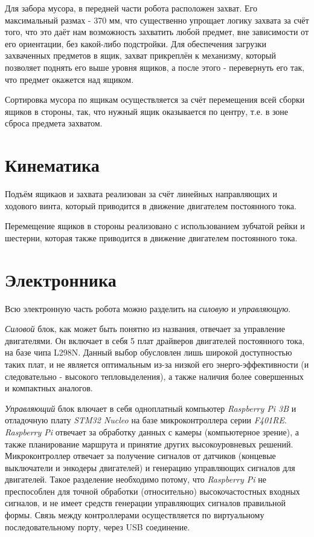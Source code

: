 \documentclass[11pt]{article}
\let\oldsection\section
\renewcommand\section{\pagebreak\oldsection}
\begin{document}
Для забора мусора, в передней части робота расположен захват. Его максимальный размах - 370 мм, что существенно упрощает логику захвата за счёт того, что это даёт нам возможность захватить любой предмет, вне зависимости от его ориентации, без какой-либо подстройки. Для обеспечения загрузки захваченных предметов в ящик, захват прикреплён к механизму, который позволяет поднять его выше уровня ящиков, а после этого - перевернуть его так, что предмет окажется над ящиком.

Сортировка мусора по ящикам осуществляется за счёт перемещения всей сборки ящиков в стороны, так, что нужный ящик оказывается по центру, т.е. в зоне сброса предмета захватом.
\section{Кинематика}
\label{sec:orgeab545d}
Подъём ящикаов и захвата реализован за счёт линейных направляющих и ходового винта, который приводится в движение двигателем постоянного тока.

Перемещение ящиков в стороны реализовано с использованием зубчатой рейки и шестерни, которая также приводится в движение двигателем постоянного тока.
\section{Электронника}
\label{sec:org85b2dec}
Всю электронную часть робота можно разделить на \emph{силовую} и \emph{управляющую}.

\emph{Силовой} блок, как может быть понятно из названия, отвечает за управление двигателями. Он включает в себя 5 плат драйверов двигателей постоянного тока, на базе чипа L298N. Данный выбор обусловлен лишь широкой доступностью таких плат, и не является оптимальным из-за низкой его энерго-эффективности (и следовательно - высокого тепловыделения), а также наличия более совершенных и компактных аналогов.

\emph{Управляющий} блок влючает в себя одноплатный компьютер \emph{Raspberry Pi 3B} и отладочную плату \emph{STM32 Nucleo} на базе микроконтроллера серии \emph{F401RE}.
\emph{Raspberry Pi} отвечает за обработку данных с камеры (компьютерное зрение), а также планирование маршрута и принятие других высокоуровневых решений.
Микроконтроллер отвечает за получение сигналов от датчиков (концевые выключатели и энкодеры двигателей) и генерацию управляющих сигналов для двигателей.
Такое разделение необходимо потому, что \emph{Raspberry Pi} не преспособлен для точной обработки (относительно) высокочастостных входных сигналов, и не имеет средств генерации управляющих сигналов правильной формы.
Связь между контроллерами осуществляется по виртуальному последовательному порту, через USB соединение.
\end{document}
